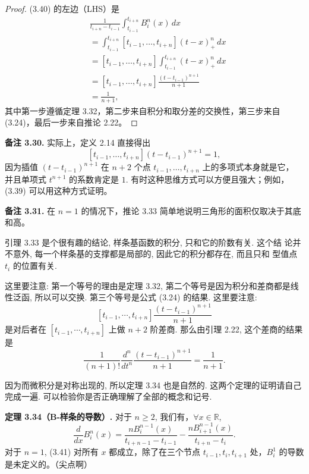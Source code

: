 \documentclass[a4paper]{ctexart}
\begin{document}
{\begin{proof}
 (3.40) 的左边（LHS）是
  \begin{align*}
  &\frac{1}{t_{i+n} - t_{i-1}} \int_{t_{i-1}}^{t_{i+n}} B_{i}^{n}(x) \, dx \\
  &= \int_{t_{i-1}}^{t_{i+n}} [t_{i-1}, \ldots, t_{i+n}](t-x)_+^n \, dx \\
  &= [t_{i-1}, \ldots, t_{i+n}] \int_{t_{i-1}}^{t_{i+n}} (t-x)_+^n \, dx \\
  &= [t_{i-1}, \ldots, t_{i+n}] \frac{(t - t_{i-1})^{n+1}}{n+1} \\
  &= \frac{1}{n+1},
  \end{align*}
  其中第一步遵循定理 3.32，第二步来自积分和取分差的交换性，第三步来自 (3.24)，最后一步来自推论 2.22。
\end{proof}

\noindent \textbf{备注 3.30.} 实际上，定义 2.14 直接得出
\[
[t_{i-1}, \ldots, t_{i+n}](t - t_{i-1})^{n+1} = 1,
\]
因为插值 $\left(t - t_{i-1}\right)^{n+1}$ 在 $n+2$ 个点 $t_{i-1}, \ldots, t_{i+n}$ 上的多项式本身就是它，
并且单项式 $t^{n+1}$ 的系数肯定是 $1$. 有时这种思维方式可以方便且强大；例如，(3.39) 可以用这种方式证明。

\noindent \textbf{备注 3.31.} 在 $n=1$ 的情况下，推论 3.33 简单地说明三角形的面积仅取决于其底和高。

引理 3.33 是个很有趣的结论, 样条基函数的积分, 只和它的阶数有关. 这个结
论并不意外, 每一个样条基的支撑都是局部的, 因此它的积分都存在, 而且只和
型值点 $t_i$ 的位置有关. 

这里要注意: 第一个等号的理由是定理 3.32, 第二个等号是因为积分和差商都是线性泛函, 
所以可以交换. 第三个等号是公式 (3.24) 的结果. 这里要注意:
$$
[t_{i - 1}, \cdots, t_{i + n}] \frac{(t - t_{i - 1})^{n + 1}}{n + 1}
$$
是对后者在 $[t_{i - 1}, \cdots, t_{i + n}]$ 上做 $n + 2$ 阶差商. 
那么由引理 2.22, 这个差商的结果是
$$
\frac{1}{(n + 1)!} \frac{d^n}{d t^n} \frac{(t - t_{i - 1})^{n + 1}}{n + 1} 
= \frac{1}{n + 1}.
$$

因为而微积分是对称出现的, 所以定理 3.34 也是自然的. 这两个定理的证明请自己
完成一遍. 可以检验你是否正确理解了全部的概念和记号.

\noindent \textbf{定理 3.34（B-样条的导数）.} 对于 $n \geq 2$, 我们有，$\forall x \in \mathbb{R}$,
\[
\frac{d}{dx} B_{i}^{n}(x) = \frac{n B_{i}^{n-1}(x)}{t_{i+n-1} - t_{i-1}} - \frac{n B_{i+1}^{n-1}(x)}{t_{i+n} - t_{i}}.
\tag{3.41}
\]
对于 $n=1$, (3.41) 对所有 $x$ 都成立，除了在三个节点 $t_{i-1}, t_{i}, t_{i+1}$ 处，$B_{i}^{1}$ 的导数是未定义的。（尖点啊）

}
\end{document}

